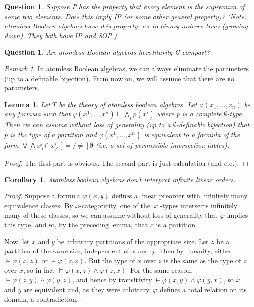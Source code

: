 \documentclass[final,a4paper,12pt]{amsart}
\newcommand{\bigland}{\bigwedge}
\newcommand{\biglor}{\bigvee}
\newcommand{\proves}{\vdash}
\newtheorem{lem}[thm]{Lemma}
\newtheorem{cor}[thm]{Corollary}
\newtheorem{qu}[thm]{Question}
\theoremstyle{remark}
\newtheorem{rem}[thm]{Remark}
\theoremstyle{definition}
\begin{document}
	\begin{qu}
		Suppose $P$ has the property that every element is the supremum of some two elements. Does this imply IP (or some other general property)? (Note: atomless Boolean algebras have this property, as do binary ordered trees (growing down). They both have IP and SOP.)
	\end{qu}
	
	\begin{qu}
		Are atomless Boolean algebras hereditarily G-compact?
	\end{qu}
	
	\begin{rem}
		In atomless Boolean algebras, we can always eliminate the parameters (up to a definable bijection). From now on, we will assume that there are no parameters.
	\end{rem}
	
	\begin{lem}
		Let $T$ be the theory of atomless boolean algebras. Let $\varphi(x_1,\ldots,x_n)$ be any formula such that $\varphi(x^1,\ldots,x^n)\proves \bigland_i p(x^i)$ where $p$ is a complete $\emptyset$-type. Then we can assume without loss of generality (up to a $\emptyset$-definable bijection) that $p$ is the type of a partition and $\varphi(x^1,\ldots,x^n)$ is equivalent to a formula of the form $\biglor\bigland x_j^i\cap x_{j'}^{i'}\mathrel{[{=}/{\neq}]}\emptyset$ (i.e. a set of \emph{permissible} intersection tables).
	\end{lem}
	\begin{proof}
		The first part is obvious. The second part is just calculation (and q.e.).
	\end{proof}
	
	\begin{cor}
		Atomless boolean algebras don't interpret infinite linear orders.
	\end{cor}
	\begin{proof}
		Suppose a formula $\varphi(x,y)$ defines a linear preorder with infinitely many equivalence classes. By $\omega$-categoricity, one of the $\lvert x\rvert$-types intersects infinitely many of these classes, so we can assume without loss of generality that $\varphi$ implies this type, and so, by the preceding lemma, that $x$ is a partition.
		
		Now, let $x$ and $y$ be arbitrary partitions of the appropriate size. Let $z$ be a partition of the same size, independent of $x$ and $y$. Then by linearity, either $\models \varphi(x,z)$ or $\models \varphi(z,x)$. But the type of $x$ over $z$ is the same as the type of $z$ over $x$, so in fact $\models\varphi(x,z)\land \varphi(z,x)$. For the same reason, $\models \varphi(z,y)\land \varphi(y,z)$, and hence by transitivity $\models \varphi(x,y)\land \varphi(y,x)$, so $x$ and $y$ are equivalent and, as they were arbitrary, $\varphi$ defines a total relation on its domain, a contradiction.
	\end{proof}
	
\end{document}
